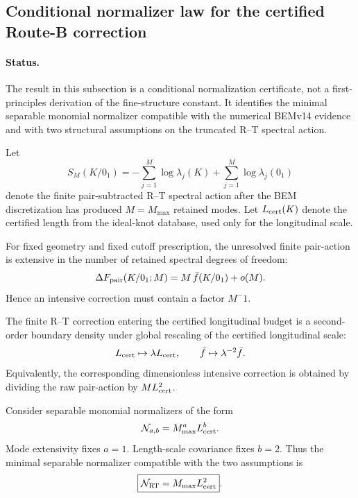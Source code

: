 
\subsection{Conditional normalizer law for the certified Route-B correction}

\paragraph{Status.}
The result in this subsection is a conditional normalization certificate, not a
first-principles derivation of the fine-structure constant. It identifies the
minimal separable monomial normalizer compatible with the numerical BEMv14
evidence and with two structural assumptions on the truncated R--T spectral action.

Let
\[
S_M(K/0_1)
=
-\sum_{j=1}^M \log\lambda_j(K)
+
\sum_{j=1}^M \log\lambda_j(0_1)
\]
denote the finite pair-subtracted R--T spectral action after the BEM
discretization has produced \(M=M_{\max}\) retained modes. Let
\(L_{\rm cert}(K)\) denote the certified length from the ideal-knot database,
used only for the longitudinal scale.

\begin{assumption}
For fixed geometry and fixed cutoff prescription, the unresolved finite
pair-action is extensive in the number of retained spectral degrees of freedom:
\[
\Delta F_{\rm pair}(K/0_1;M)
=
M\,\bar f(K/0_1)+o(M).
\]
Hence an intensive correction must contain a factor \(M^-1\).
\end{assumption}

\begin{assumption}
The finite R--T correction entering the certified longitudinal budget is a
second-order boundary density under global rescaling of the certified
longitudinal scale:
\[
L_{\rm cert}\mapsto \lambda L_{\rm cert},
\qquad
\bar f\mapsto \lambda^{-2}\bar f .
\]
Equivalently, the corresponding dimensionless intensive correction is obtained
by dividing the raw pair-action by \(M L_{\rm cert}^2\).
\end{assumption}

\begin{lemma}
Consider separable monomial normalizers of the form
\[
\mathcal N_{a,b}=M_{\max}^a L_{\rm cert}^b .
\]
Mode extensivity fixes \(a=1\). Length-scale covariance fixes \(b=2\). Thus
the minimal separable normalizer compatible with the two assumptions is
\[
\boxed{\mathcal N_{\rm RT}=M_{\max}L_{\rm cert}^2}.
\]
\end{lemma}

